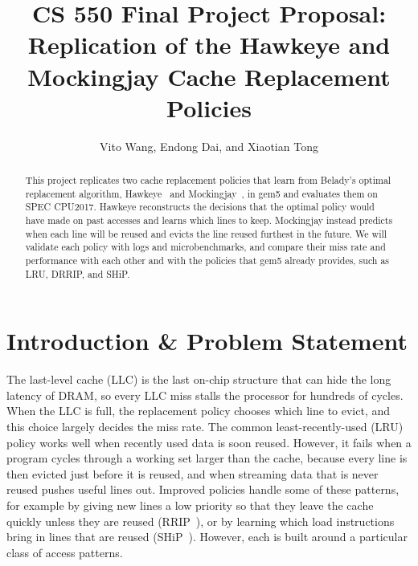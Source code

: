 \documentclass[lettersize,journal]{IEEEtran}
\begin{document}
\title{CS 550 Final Project Proposal:\\Replication of the Hawkeye and
Mockingjay Cache Replacement Policies}

\author{Vito Wang, Endong Dai, and Xiaotian Tong}

\maketitle

\begin{abstract}
This project replicates two cache replacement policies that learn from
Belady's optimal replacement algorithm, Hawkeye~\cite{hawkeye} and
Mockingjay~\cite{mockingjay}, in gem5 and evaluates them on SPEC CPU2017.
Hawkeye reconstructs the decisions that the optimal policy would have made on
past accesses and learns which lines to keep. Mockingjay instead predicts when
each line will be reused and evicts the line reused furthest in the future. We
will validate each policy with logs and microbenchmarks, and compare their miss
rate and performance with each other and with the policies that gem5 already
provides, such as LRU, DRRIP, and SHiP.
\end{abstract}

\section{Introduction \& Problem Statement}

The last-level cache (LLC) is the last on-chip structure that can hide the long
latency of DRAM, so every LLC miss stalls the processor for hundreds of cycles.
When the LLC is full, the replacement policy chooses which line to evict, and
this choice largely decides the miss rate. The common least-recently-used (LRU)
policy works well when recently used data is soon reused. However, it fails when
a program cycles through a working set larger than the cache, because every
line is then evicted just before it is reused, and when streaming data that is
never reused pushes useful lines out. Improved policies handle some of these
patterns, for example by giving new lines a low priority so that they leave
the cache quickly unless they are reused (RRIP~\cite{rrip}), or by learning
which load instructions bring in lines that are reused (SHiP~\cite{ship}).
However, each is built around a particular class of access patterns.
\end{document}
